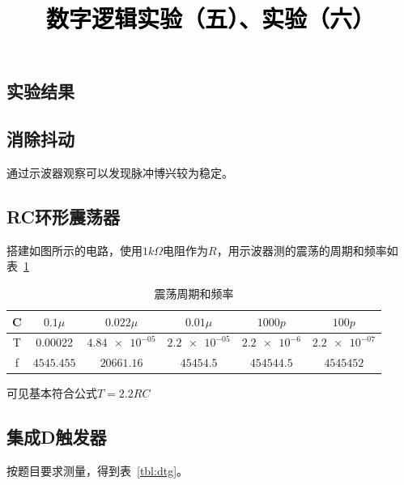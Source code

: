 \documentclass[a4paper,twoside]{ctexart}
\newcommand{\PaperTitle}{数字逻辑实验（五）、实验（六）}  %
\begin{document}
\newpage

\title{
	\Large{\textcolor{black}{\PaperTitle}}
}
 
\newpage
\setcounter{page}{1}

\begin{spacing}{1.2}


\setcounter{section}{4}

\section{实验结果}

\subsection{消除抖动}

通过示波器观察可以发现脉冲博兴较为稳定。

\subsection{RC环形震荡器}

搭建如图所示的电路，使用$1k\Omega$电阻作为$R$，用示波器测的震荡的周期和频率如表~\ref{tbl:rc}

\begin{table}[htbp]
	\centering
	\caption{震荡周期和频率}
	\label{tbl:rc}
	\begin{tabular}{c|ccccc}
		\toprule
		\hline
		C & $0.1\mu$ & $0.022\mu$ & $0.01\mu$ & $1000p$ & $100p$ \\
		\hline
		T & 0.00022 & $\num{4.84e-05}$ & $\num{2.2e-05}$ & $\num{2.2e-6}$ & $\num{2.2e-07}$ \\ 
		\hline
		f & $4545.455$& $20661.16$ & $45454.5$ & $454544.5$ & $4545452$ \\
		\hline
		\bottomrule 
	\end{tabular}	
\end{table}

可见基本符合公式$T=2.2RC$

\subsection{集成D触发器}

按题目要求测量，得到表~\ref{tbl:dtg}。


\end{spacing}
\end{document}
